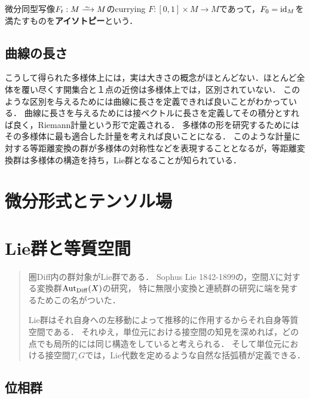 \documentclass[uplatex,dvipdfmx]{jsreport}
\begin{document}
\begin{definition}[isotopy]
    微分同型写像$F_t:M\iso M$のcurrying $F:[0,1]\times M\to M$であって，$F_0=\mathrm{id}_M$を満たすものを\textbf{アイソトピー}という．
\end{definition}

\section{曲線の長さ}

\begin{tcolorbox}[colframe=ForestGreen, colback=ForestGreen!10!white,breakable,colbacktitle=ForestGreen!40!white,coltitle=black,fonttitle=\bfseries\sffamily,
title=]
    こうして得られた多様体上には，実は大きさの概念がほとんどない．ほとんど全体を覆い尽くす開集合と１点の近傍は多様体上では，区別されていない．
    このような区別を与えるためには曲線に長さを定義できれば良いことがわかっている．
    曲線に長さを与えるためには接ベクトルに長さを定義してその積分とすれば良く，Riemann計量という形で定義される．
    多様体の形を研究するためにはその多様体に最も適合した計量を考えれば良いことになる．
    このような計量に対する等距離変換の群が多様体の対称性などを表現することとなるが，等距離変換群は多様体の構造を持ち，Lie群となることが知られている．
\end{tcolorbox}

\chapter{微分形式とテンソル場}

\chapter{Lie群と等質空間}

\begin{quotation}
    圏Diff内の群対象がLie群である．
    Sophus Lie 1842-1899の，空間$X$に対する変換群$\mathrm{Aut}_{\mathrm{Diff}}(X)$の研究，
    特に無限小変換と連続群の研究に端を発するためこの名がついた．

    Lie群はそれ自身への左移動によって推移的に作用するからそれ自身等質空間である．
    それゆえ，単位元における接空間の知見を深めれば，どの点でも局所的には同じ構造をしていると考えられる．
    そして単位元における接空間$T_eG$では，Lie代数を定めるような自然な括弧積が定義できる．
\end{quotation}

\section{位相群}
\end{document}
